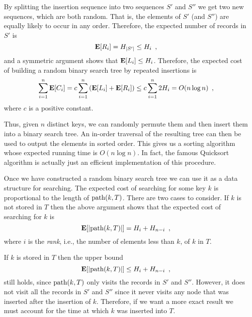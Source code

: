 By splitting the insertion sequence into two sequences $S'$ and $S''$
we get two new sequences, which are both random.  That is, the
elements of $S'$ (and $S''$) are equally likely to occur in any order.
Therefore, the expected number of records in $S'$ is
\[
\mathbf{E}[R_i] = H_{|S'|} \le H_i \enspace ,
\]
and a symmetric argument shows that $\mathbf{E}[L_i]\le H_i$.  Therefore, the
expected cost of building a random binary search tree by repeated
insertions is
\[
\sum_{i=1}^n\mathbf{E}[C_i] = c \sum_{i=1}^n\left(\mathbf{E}[L_i]+\mathbf{E}[R_i]\right) 
	\le c \sum_{i=1}^n2H_i
	= O(n\log n) \enspace ,
\]
where $c$ is a positive constant.

Thus, given $n$ distinct keys, we can randomly permute them and then
insert them into a binary search tree.  An in-order traversal of the
resulting tree can then be used to output the elements in sorted
order.  This gives us a sorting algorithm whose expected running time
is $O(n\log n)$. In fact, the famous Quicksort algorithm is actually
just an efficient implementation of this procedure.

Once we have constructed a random binary search tree we can use it as
a data structure for searching.  The expected cost of searching for
some key $k$ is proportional to the length of $\mathrm{path}(k,T)$. There are
two cases to consider.  If $k$ is not stored in $T$ then the above
argument shows that the expected cost of searching for $k$ is 
\begin{equation}
	\E[|\path(k,T)|] = H_i + H_{n-i} \enspace ,
\eqlabel{path-length-absent}
\end{equation} 
where $i$ is the \emph{rank}, i.e., the number of elements less than
$k$, of $k$ in $T$.

If $k$ is stored in $T$ then the upper bound
\[
	\mathbf{E}[|\mathrm{path}(k,T)|] \le H_i + H_{n-i} \enspace ,
\]
still holds, since $\mathrm{path}(k,T)$ only visits the records in $S'$ and
$S''$.  However, it does not visit all the records in $S'$ and $S''$
since it never visits any node that was inserted after the
insertion of $k$.  Therefore, if we want a more exact result we  must
account for the time at which $k$ was inserted into $T$.  

